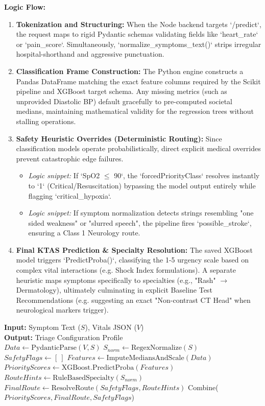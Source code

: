 \documentclass[12pt,a4paper]{article}
\begin{document}
\textbf{Logic Flow:}
\begin{enumerate}
    \item \textbf{Tokenization and Structuring:} When the Node backend targets `/predict`, the request maps to rigid Pydantic schemas validating fields like `heart_rate` or `pain_score`. Simultaneously, `normalize_symptoms_text()` strips irregular hospital-shorthand and aggressive punctuation.
    \item \textbf{Classification Frame Construction:} The Python engine constructs a Pandas DataFrame matching the exact feature columns required by the Scikit pipeline and XGBoost target schema. Any missing metrics (such as unprovided Diastolic BP) default gracefully to pre-computed societal medians, maintaining mathematical validity for the regression trees without stalling operations.
    \item \textbf{Safety Heuristic Overrides (Deterministic Routing):} Since classification models operate probabilistically, direct explicit medical overrides prevent catastrophic edge failures.
    \begin{itemize}
        \item \textit{Logic snippet:} If `SpO2 $\leq$ 90`, the `forcedPriorityClass` resolves instantly to `1` (Critical/Resuscitation) bypassing the model output entirely while flagging `critical_hypoxia`.
        \item \textit{Logic snippet:} If symptom normalization detects strings resembling "one sided weakness" or "slurred speech", the pipeline fires `possible_stroke`, ensuring a Class 1 Neurology route.
    \end{itemize}
    \item \textbf{Final KTAS Prediction \& Specialty Resolution:} The saved XGBoost model triggers `PredictProba()`, classifying the 1-5 urgency scale based on complex vital interactions (e.g. Shock Index formulations). A separate heuristic maps symptoms specifically to specialties (e.g., "Rash" $\rightarrow$ Dermatology), ultimately culminating in explicit Baseline Test Recommendations (e.g. suggesting an exact "Non-contrast CT Head" when neurological markers trigger).
\end{enumerate}

\begin{algorithm}[H]
\small
\SetAlgoLined
\textbf{Input:} Symptom Text ($S$), Vitals JSON ($V$)\\
\textbf{Output:} Triage Configuration Profile\\
$Data \gets \text{PydanticParse}(V, S)$\;
$S_{norm} \gets \text{RegexNormalize}(S)$\;
$SafetyFlags \gets [~\text{}]$\;
$Features \gets \text{ImputeMediansAndScale}(Data)$\;
$PriorityScores \gets \text{XGBoost.PredictProba}(Features)$\;
$RouteHints \gets \text{RuleBasedSpecialty}(S_{norm})$\;
$FinalRoute \gets \text{ResolveRoute}(SafetyFlags, RouteHints)$\;
\Return Combine($PriorityScores, FinalRoute, SafetyFlags$)\;
\caption{XGBoost Triage Safety Constraint Resolution Flow}
\end{algorithm}
\end{document}
